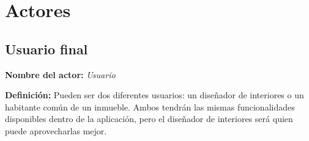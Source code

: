 \section{Actores}

\subsection{Usuario final}
\textbf{Nombre del actor:} \textit{Usuario}\par
\textbf{Definición:} Pueden ser dos diferentes usuarios: un diseñador de interiores o un habitante común de un inmueble. Ambos tendrán las mismas funcionalidades disponibles dentro de la aplicación, pero el diseñador de interiores será quien puede aprovecharlas mejor.